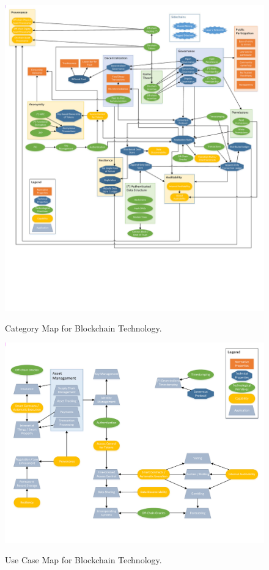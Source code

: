 \begin{figure}
	\includegraphics[width=\textwidth]{img/grounded-theory-main}
	\label{fig:grounded-theory-main}
	\caption{Category Map for Blockchain Technology.}
\end{figure}

\begin{figure}
	\includegraphics[width=\textwidth]{img/grounded-theory-apps}
	\label{fig:grounded-theory-apps}
	\caption{Use Case Map for Blockchain Technology.}
\end{figure}


